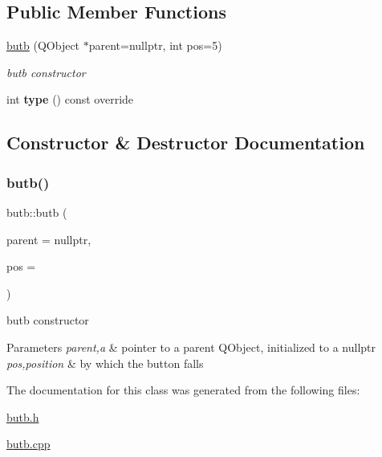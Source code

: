 \subsection*{Public Member Functions}
\begin{DoxyCompactItemize}
\item 
\hyperlink{classbutb_a8a6a1e82497086cc0cc6fb4732fa5edb}{butb} (Q\+Object $\ast$parent=nullptr, int pos=5)
\begin{DoxyCompactList}\small\item\em butb constructor \end{DoxyCompactList}\item 
\mbox{\label{classbutb_a5322fcf31cfb49cc19219a366ec4a56f}} 
int {\bfseries type} () const override
\end{DoxyCompactItemize}


\subsection{Constructor \& Destructor Documentation}
\mbox{\label{classbutb_a8a6a1e82497086cc0cc6fb4732fa5edb}} 
\subsubsection{\texorpdfstring{butb()}{butb()}}
{\footnotesize\ttfamily butb\+::butb (\begin{DoxyParamCaption}\item[{Q\+Object $\ast$}]{parent = {\ttfamily nullptr},  }\item[{int}]{pos = {} }\end{DoxyParamCaption})\hspace{0.3cm}{\ttfamily [explicit]}}



butb constructor 


\begin{DoxyParams}{Parameters}
{\em parent,a} & pointer to a parent Q\+Object, initialized to a nullptr \\
\hline
{\em pos,position} & by which the button falls \\
\hline
\end{DoxyParams}


The documentation for this class was generated from the following files\+:\begin{DoxyCompactItemize}
\item 
\hyperlink{butb_8h}{butb.\+h}\item 
\hyperlink{butb_8cpp}{butb.\+cpp}\end{DoxyCompactItemize}
